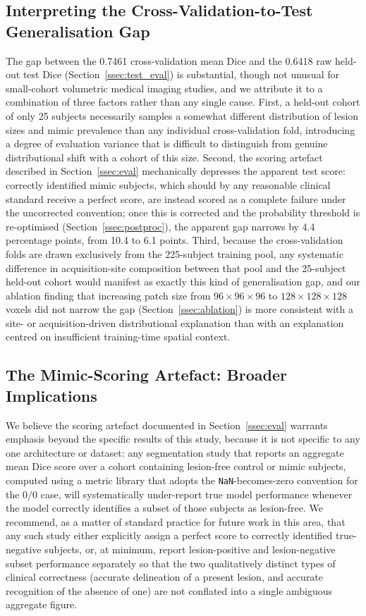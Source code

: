 \documentclass[pdflatex,sn-mathphys-num]{sn-jnl}
\begin{document}
\subsection{Interpreting the Cross-Validation-to-Test Generalisation Gap}\label{ssec:gap_discussion}
The gap between the 0.7461 cross-validation mean Dice and the 0.6418
raw held-out test Dice (Section~\ref{ssec:test_eval}) is substantial,
though not unusual for small-cohort volumetric medical imaging
studies, and we attribute it to a combination of three factors rather
than any single cause. First, a held-out cohort of only 25 subjects
necessarily samples a somewhat different distribution of lesion sizes
and mimic prevalence than any individual cross-validation fold,
introducing a degree of evaluation variance that is difficult to
distinguish from genuine distributional shift with a cohort of this
size. Second, the scoring artefact described in
Section~\ref{ssec:eval} mechanically depresses the apparent test
score: correctly identified mimic subjects, which should by any
reasonable clinical standard receive a perfect score, are instead
scored as a complete failure under the uncorrected convention; once
this is corrected and the probability threshold is re-optimised
(Section~\ref{ssec:postproc}), the apparent gap narrows by 4.4
percentage points, from 10.4 to 6.1 points. Third, because the
cross-validation folds are drawn exclusively from the 225-subject
training pool, any systematic difference in acquisition-site
composition between that pool and the 25-subject held-out cohort would
manifest as exactly this kind of generalisation gap, and our ablation
finding that increasing patch size from $96 \times 96 \times 96$ to $128 \times 128 \times 128$ voxels did
not narrow the gap (Section~\ref{ssec:ablation}) is more consistent
with a site- or acquisition-driven distributional explanation than
with an explanation centred on insufficient training-time spatial
context.

\subsection{The Mimic-Scoring Artefact: Broader Implications}\label{ssec:mimic_discussion}
We believe the scoring artefact documented in
Section~\ref{ssec:eval} warrants emphasis beyond the specific results
of this study, because it is not specific to any one architecture or
dataset: any segmentation study that reports an aggregate mean Dice
score over a cohort containing lesion-free control or mimic subjects,
computed using a metric library that adopts the
\texttt{NaN}-becomes-zero convention for the $0/0$ case, will
systematically under-report true model performance whenever the model
correctly identifies a subset of those subjects as lesion-free. We
recommend, as a matter of standard practice for future work in this
area, that any such study either explicitly assign a perfect score to
correctly identified true-negative subjects, or, at minimum, report
lesion-positive and lesion-negative subset performance separately so
that the two qualitatively distinct types of clinical correctness (accurate
delineation of a present lesion, and accurate recognition of the
absence of one) are not conflated into a single ambiguous
aggregate figure.
\end{document}
